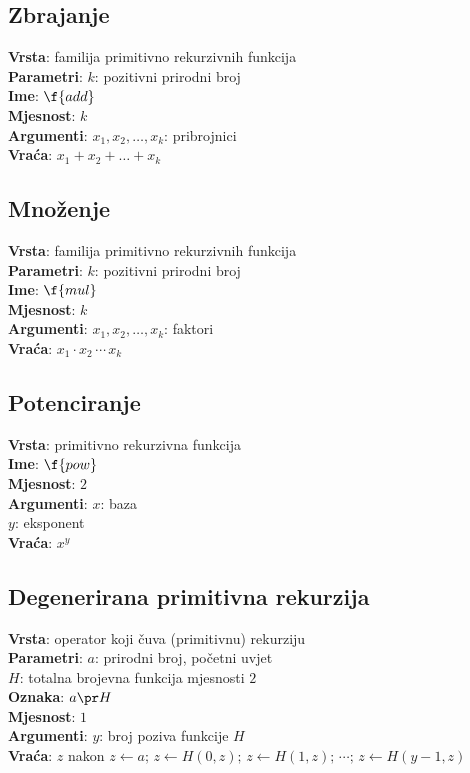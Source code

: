 \subsection{Zbrajanje}
\textbf{Vrsta}: familija primitivno rekurzivnih funkcija\\
\textbf{Parametri}: $k$: pozitivni prirodni broj\\
\textbf{Ime}: $\f{add}$\\
\textbf{Mjesnost}: $k$\\
\textbf{Argumenti}: $x_1,x_2,\dots,x_k$: pribrojnici\\
\textbf{Vraća}: $x_1+x_2+\dots+x_k$

\subsection{Množenje}
\textbf{Vrsta}: familija primitivno rekurzivnih funkcija\\
\textbf{Parametri}: $k$: pozitivni prirodni broj\\
\textbf{Ime}: $\f{mul}$\\
\textbf{Mjesnost}: $k$\\
\textbf{Argumenti}: $x_1,x_2,\dots,x_k$: faktori\\
\textbf{Vraća}: $x_1\cdot x_2\,\dotsm\,x_k$

\subsection{Potenciranje}
\textbf{Vrsta}: primitivno rekurzivna funkcija\\
\textbf{Ime}: $\f{pow}$\\
\textbf{Mjesnost}: $2$\\
\textbf{Argumenti}: $x$: baza\\
$y$: eksponent\\
\textbf{Vraća}: $x^y$

\subsection{Degenerirana primitivna rekurzija}
\textbf{Vrsta}: operator koji čuva (primitivnu) rekurziju\\
\textbf{Parametri}: $a$: prirodni broj, početni uvjet\\
$H$: totalna brojevna funkcija mjesnosti $2$\\
\textbf{Oznaka}: $a\pr H$\\
\textbf{Mjesnost}: $1$\\
\textbf{Argumenti}: $y$: broj poziva funkcije $H$\\
\textbf{Vraća}: $z$ nakon $z\leftarrow a;\,z\leftarrow H(0,z);\,z\leftarrow H(1,z);\,\dotsm;\,z\leftarrow H(y-1,z)$

